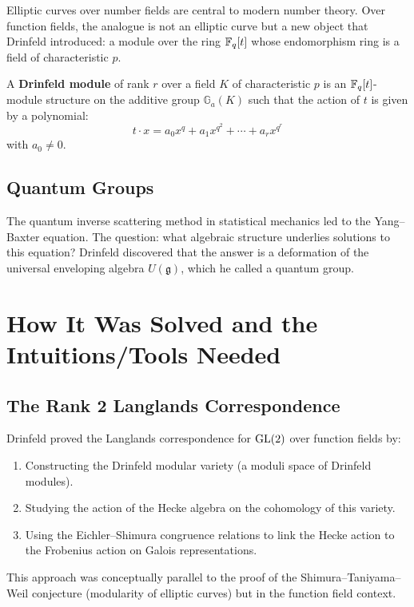 Elliptic curves over number fields are central to modern number theory. Over function fields, the analogue is not an elliptic curve but a new object that Drinfeld introduced: a module over the ring $\mathbb{F}_q[t]$ whose endomorphism ring is a field of characteristic $p$.

\begin{definition}
A \textbf{Drinfeld module} of rank $r$ over a field $K$ of characteristic $p$ is an $\mathbb{F}_q[t]$-module structure on the additive group $\mathbb{G}_a(K)$ such that the action of $t$ is given by a polynomial:
\[
t \cdot x = a_0 x^q + a_1 x^{q^2} + \cdots + a_r x^{q^r}
\]
with $a_0 \neq 0$.
\end{definition}

\subsection{Quantum Groups}

The quantum inverse scattering method in statistical mechanics led to the Yang--Baxter equation. The question: what algebraic structure underlies solutions to this equation? Drinfeld discovered that the answer is a deformation of the universal enveloping algebra $U(\mathfrak{g})$, which he called a quantum group.

\section{How It Was Solved and the Intuitions/Tools Needed}

\subsection{The Rank 2 Langlands Correspondence}

Drinfeld proved the Langlands correspondence for $\operatorname{GL}(2)$ over function fields by:
\begin{enumerate}
    \item Constructing the Drinfeld modular variety (a moduli space of Drinfeld modules).
    \item Studying the action of the Hecke algebra on the cohomology of this variety.
    \item Using the Eichler--Shimura congruence relations to link the Hecke action to the Frobenius action on Galois representations.
\end{enumerate}

This approach was conceptually parallel to the proof of the Shimura--Taniyama--Weil conjecture (modularity of elliptic curves) but in the function field context.

